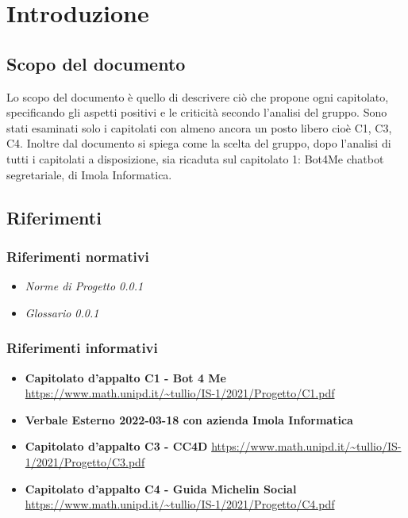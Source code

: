 \section{Introduzione}
		\subsection {Scopo del documento}
		Lo scopo del documento è quello di descrivere ciò che propone ogni capitolato, specificando gli aspetti positivi e le criticità secondo l'analisi del gruppo.
		\newline Sono stati esaminati solo i capitolati con almeno ancora un posto libero cioè C1, C3, C4. 
        Inoltre dal documento si spiega come la scelta del gruppo, dopo l'analisi di tutti i capitolati a disposizione, sia ricaduta sul capitolato 1: 
        Bot4Me chatbot segretariale, di Imola Informatica.
		\subsection {Riferimenti} 
			\subsubsection {Riferimenti normativi} 
			\begin{itemize}
				\item \textit{Norme di Progetto 0.0.1}
				\item \textit{Glossario 0.0.1}
			\end{itemize}
			\subsubsection {Riferimenti informativi} 
			\begin{itemize}
				\item \textbf{Capitolato d'appalto C1 - Bot 4 Me}\newline
				\url{https://www.math.unipd.it/~tullio/IS-1/2021/Progetto/C1.pdf}
				\item \textbf{Verbale Esterno 2022-03-18 con azienda Imola Informatica}
				\item \textbf{Capitolato d'appalto C3 - CC4D}\newline
				\url{https://www.math.unipd.it/~tullio/IS-1/2021/Progetto/C3.pdf}
				\item \textbf{Capitolato d'appalto C4 - Guida Michelin Social}\newline
				\url{https://www.math.unipd.it/~tullio/IS-1/2021/Progetto/C4.pdf}
			\end{itemize}
